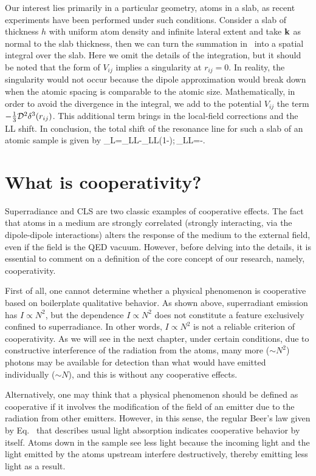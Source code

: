 Our interest lies primarily in a particular geometry, atoms in a slab, as recent experiments have been performed under such conditions. Consider a slab of thickness $h$ with uniform  atom density and infinite lateral extent and take $\bf k$ as normal to the slab thickness, then we can turn the summation in~ into a spatial integral over the slab. Here we omit the details of the integration, but it should be noted that the form of $V_{ij}$ implies a singularity at $r_{ij}=0$. In reality, the singularity would not occur because the dipole approximation would break down when the atomic spacing is comparable to the atomic size. Mathematically, in order to avoid the divergence in the integral, we  add to the potential $V_{ij}$ the term $-\frac{1}{3}\dip^2\delta^3(r_{ij})$. This additional term brings in the local-field corrections and the LL shift.
In conclusion, the total shift of the resonance line for such a slab of an atomic sample is given by
\bea
\Delta_L=\Delta_{LL}-\Delta_{LL}\left(1-\right);\,\quad\Delta_{LL}=-.
\label{CLS_1}
\eea


\section{What is cooperativity?}

Superradiance and CLS are two classic examples of cooperative effects. The fact that atoms in a medium are strongly correlated (strongly interacting, via the dipole-dipole interactions) alters the response of the medium to the external field, even if the field is the QED vacuum. However, before delving into the details, it is essential to comment on a definition of the core concept of our research, namely, cooperativity.

First of all, one cannot determine whether a physical phenomenon is cooperative based on boilerplate qualitative behavior. As shown above, superradiant emission has $I\propto N^2$, but the dependence $I\propto N^2$ does not constitute a feature exclusively confined to superradiance. In other words, $I\propto N^2$ is not a reliable criterion of cooperativity. As we will see in the next chapter, under certain conditions, due to constructive interference of the radiation from the atoms, many more ($\sim N^2$) photons may be available for detection than what would have emitted individually ($\sim N$), and this is without any cooperative effects.
 
Alternatively, one may think that a physical phenomenon should be defined as cooperative if it involves the modification of the field of an emitter due to the radiation from other emitters. However, in this sense, the regular Beer's law given by Eq.~ that describes usual light absorption indicates cooperative behavior by itself. Atoms down in the sample see less light because the incoming light and the light emitted by the atoms upstream interfere destructively, thereby emitting less light as a result.


